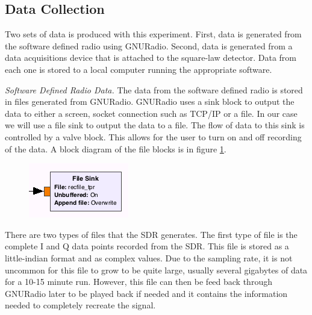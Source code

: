 \subsection{Data Collection}

Two sets of data is produced with this experiment.  First, data is generated from the software defined radio using GNURadio.  Second, data is generated from a data acquisitions device that is attached to the square-law detector.  Data from each one is stored to a local computer running the appropriate software.

\emph{Software Defined Radio Data.  }The data from the software defined radio is stored in files generated from GNURadio.  GNURadio uses a sink block to output the data to either a screen, socket connection such as TCP/IP or a file.  In our case we will use a file sink to output the data to a file.  The flow of data to this sink is controlled by a valve block.  This allows for the user to turn on and off recording of the data.  A block diagram of the file blocks is in figure \ref{filesink}.

{\begin{figure}[h!tb] \centering
\includegraphics[width=\textwidth]{Images/TPR_Filesink.png}
\label{filesink}
\end{figure}
}

There are two types of files that the SDR generates.  The first type of file is the complete I and Q data points recorded from the SDR.  This file is stored as a little-indian format and as complex values.  Due to the sampling rate, it is not uncommon for this file to grow to be quite large, usually several gigabytes of data for a 10-15 minute run.  However, this file can then be feed back through GNURadio later to be played back if needed and it contains the information needed to completely recreate the signal.

